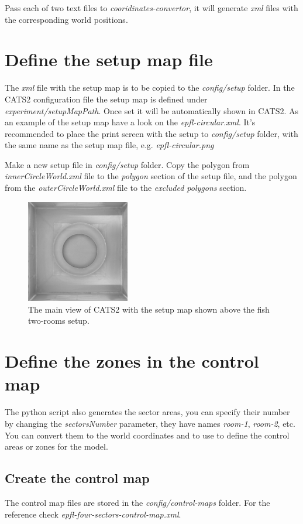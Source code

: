 \documentclass{styles/assisi}
\begin{document}
Pass each of two text files to {\it cooridinates-convertor}, it will generate {\it xml} files with the corresponding world positions.

\section{Define the setup map file}
The {\it xml} file with the setup map is to be copied to the {\it config/setup} folder. In the CATS2 configuration file the setup map is defined under {\it experiment/setupMapPath}. Once set it will be automatically shown in CATS2. As an example of the setup map have a look on the {\it epfl-circular.xml}. It's recommended to place the print screen with the setup to  {\it config/setup} folder, with the same name as the setup map file, e.g. {\it epfl-circular.png}

Make a new setup file in {\it config/setup} folder. Copy the polygon from {\it innerCircleWorld.xml} file to the {\it polygon} section of the setup file, and the polygon from the {\it outerCircleWorld.xml} file to the {\it excluded polygons} section. 

\begin{figure}[ht]
\centering
\includegraphics[width=0.4\textwidth]{./figs/epfl-circular.png}
\caption{The main view of CATS2 with the setup map shown above the fish two-rooms setup.}
\label{fig:setup-map}
\end{figure}

\section{Define the zones in the control map}
The python script also generates the sector areas, you can specify their number by changing the {\it sectorsNumber} parameter, they have names {\it room-1}, {\it room-2}, etc. You can convert them to the world coordinates and to use to define the control areas or zones for the model. 

\subsection{Create the control map}
The control map files are stored in the {\it config/control-maps} folder. For the reference check {\it epfl-four-sectors-control-map.xml}. 
\end{document}
